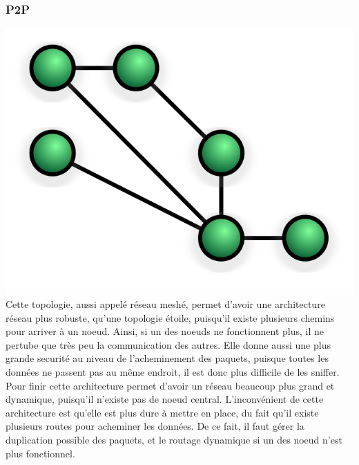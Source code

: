 	    \subsubsection{P2P}
\includegraphics{img/NetworkTopology-Mesh.svg.png}
Cette topologie, aussi appelé réseau meshé, permet d'avoir une architecture réseau plus robuste, qu'une 
topologie étoile, puisqu'il existe plusieurs chemins pour arriver à un noeud. Ainsi, si un des noeuds ne 
fonctionnent plus, il ne pertube que très peu la communication des autres. Elle donne aussi une plus grande 
securité au niveau de l'acheminement des paquets, puisque toutes les données ne passent pas au même endroit, 
il est donc plus difficile de les sniffer. Pour finir cette architecture permet d'avoir un réseau beaucoup 
plus grand et dynamique, puisqu'il n'existe pas de noeud central. L'inconvénient de cette architecture est 
qu'elle est plus dure à mettre en place, du fait qu'il existe plusieurs routes pour acheminer les données. De 
ce fait, il faut gérer la duplication possible des paquets, et le routage dynamique si un des noeud n'est plus 
fonctionnel.

